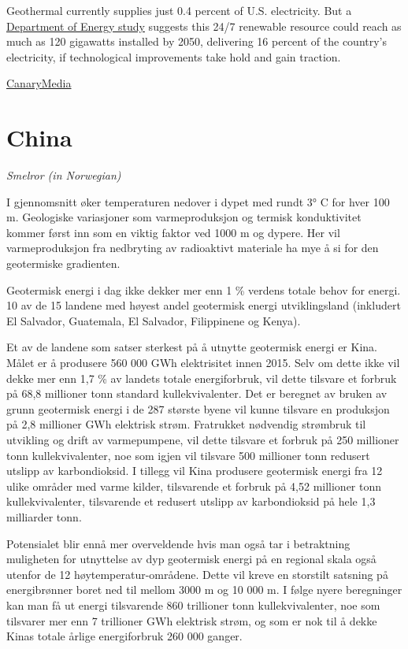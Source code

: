 \documentclass[
]{book}
\begin{document}
Geothermal currently supplies just 0.4 percent of U.S. electricity.
But a \href{https://www.energy.gov/sites/default/files/2019/06/f63/GeoVision-full-report-opt.pdf}{Department of Energy study} suggests this 24/7 renewable resource could reach as much as 120 gigawatts installed by 2050, delivering 16 percent of the country's electricity, if technological improvements take hold and gain traction.

\href{https://www.canarymedia.com/articles/google-taps-geothermal-for-corporate-clean-energy/}{CanaryMedia}

\hypertarget{china}{%
\section{China}\label{china}}

\emph{Smelror (in Norwegian)}

I gjennomsnitt øker temperaturen nedover i dypet med rundt 3° C for hver 100 m.
Geologiske variasjoner som varmeproduksjon og termisk konduktivitet kommer først inn som en viktig faktor ved 1000 m og dypere. Her vil varmeproduksjon fra nedbryting av radioaktivt materiale ha mye å si for den geotermiske gradienten.

Geotermisk energi i dag ikke dekker mer enn 1 \% verdens totale behov for energi.
10 av de 15 landene med høyest andel geotermisk energi utviklingsland (inkludert El Salvador, Guatemala, El Salvador, Filippinene og Kenya).

Et av de landene som satser sterkest på å utnytte geotermisk energi er Kina. Målet er å produsere 560 000 GWh elektrisitet innen 2015. Selv om dette ikke vil dekke mer enn 1,7 \% av landets totale energiforbruk, vil dette tilsvare et forbruk på 68,8 millioner tonn standard kullekvivalenter. Det er beregnet av bruken av grunn geotermisk energi i de 287 største byene vil kunne tilsvare en produksjon på 2,8 millioner GWh elektrisk strøm. Fratrukket nødvendig strømbruk til utvikling og drift av varmepumpene, vil dette tilsvare et forbruk på 250 millioner tonn kullekvivalenter, noe som igjen vil tilsvare 500 millioner tonn redusert utslipp av karbondioksid. I tillegg vil Kina produsere geotermisk energi fra 12 ulike områder med varme kilder, tilsvarende et forbruk på 4,52 millioner tonn kullekvivalenter, tilsvarende et redusert utslipp av karbondioksid på hele 1,3 milliarder tonn.

Potensialet blir ennå mer overveldende hvis man også tar i betraktning muligheten for utnyttelse av dyp geotermisk energi på en regional skala også utenfor de 12 høytemperatur-områdene. Dette vil kreve en storstilt satsning på energibrønner boret ned til mellom 3000 m og 10 000 m. I følge nyere beregninger kan man få ut energi tilsvarende 860 trillioner tonn kullekvivalenter, noe som tilsvarer mer enn 7 trillioner GWh elektrisk strøm, og som er nok til å dekke Kinas totale årlige energiforbruk 260 000 ganger.
\end{document}
